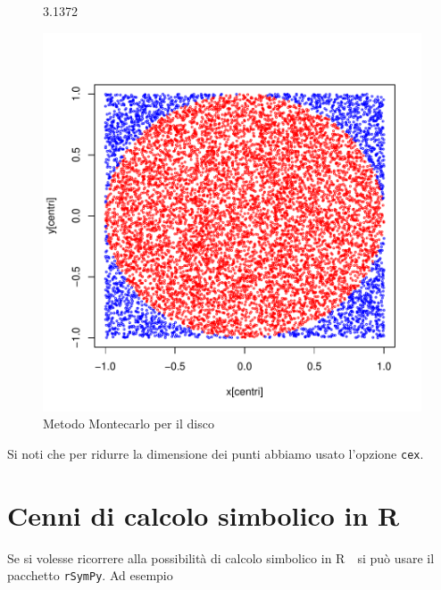 \documentclass[onecolumn,11pt]{book}
\newcommand{\rpr}{\textsf{R}~}
\begin{document}
\begin{figure}[htbp]
\begin{center}
\begin{Schunk}
\begin{Soutput}
[1] 3.1372
\end{Soutput}
\end{Schunk}
\includegraphics{Rmatematica-150}
\caption{Metodo Montecarlo per il disco}
\label{fig:newton}
\end{center}
\end{figure}
 Si noti che per ridurre la dimensione dei punti abbiamo usato l'opzione \texttt{cex}.
\section{Cenni di calcolo simbolico in \rpr}
Se si volesse ricorrere alla possibilit\`a di calcolo simbolico in \rpr\ si pu\`o usare il pacchetto \texttt{rSymPy}. Ad esempio
\end{document}
